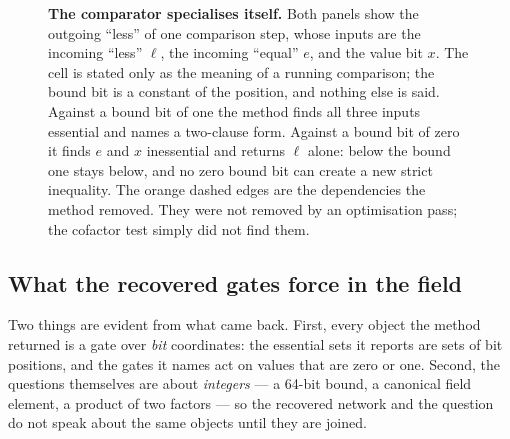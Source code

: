 \documentclass[11pt,a4paper]{article}
\begin{document}
\begin{figure}[htbp]
\centering
{}
\caption{\textbf{The comparator specialises itself.} Both panels show the
outgoing ``less'' of one comparison step, whose inputs are the incoming
``less'' $\ell$, the incoming ``equal'' $e$, and the value bit $x$. The cell is
stated only as the meaning of a running comparison; the bound bit is a constant
of the position, and nothing else is said. Against a bound bit of one the
method finds all three inputs essential and names a two-clause form. Against a
bound bit of zero it finds $e$ and $x$ inessential and returns $\ell$ alone:
below the bound one stays below, and no zero bound bit can create a new strict
inequality. The orange dashed edges are the dependencies the method removed.
They were not removed by an optimisation pass; the cofactor test simply did not
find them.}
\label{fig:comparator-specialisation}
\end{figure}

\subsection{What the recovered gates force in the field}
Two things are evident from what came back.
First, every object the method returned is a gate over \emph{bit} coordinates:
the essential sets it reports are sets of bit positions, and the gates it names
act on values that are zero or one. Second, the questions themselves are about
\emph{integers} --- a 64-bit bound, a canonical field element, a product of two
factors --- so the recovered network and the question do not speak about the
same objects until they are joined.
\end{document}
